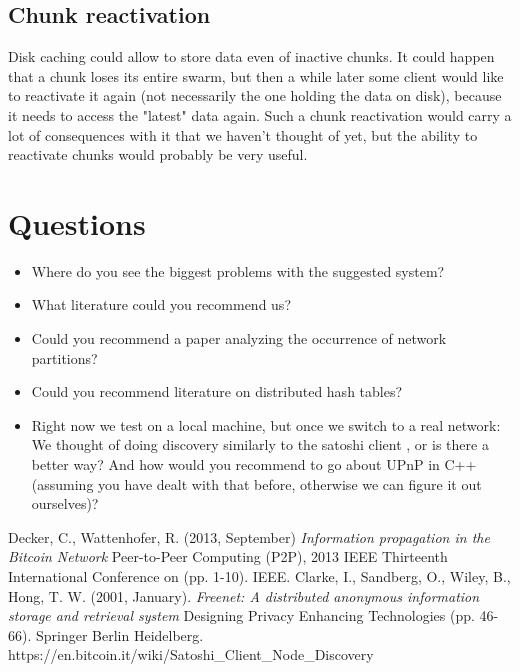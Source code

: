 \documentclass{article}
\begin{document}
\subsection{Chunk reactivation}

Disk caching could allow to store data even of inactive chunks. It could happen
that a chunk loses its entire swarm, but then a while later some client would
like to reactivate it again (not necessarily the one holding the data on disk),
because it needs to access the "latest" data again. Such a chunk reactivation
would carry a lot of consequences with it that we haven't thought of yet, but 
the ability to reactivate chunks would probably be very useful.

\section{Questions}

\begin{itemize}
  \itemsep0em
  \item Where do you see the biggest problems with the suggested system?
  \item What literature could you recommend us?
  \item Could you recommend a paper analyzing the occurrence of network
    partitions?
  \item Could you recommend literature on distributed hash tables?
  \item Right now we test on a local machine, but once we switch to a real
    network: We thought of doing discovery similarly to the satoshi client
    \cite{discovery}, or is there a better way? 
    And how would you recommend to go about UPnP in C++ (assuming you have dealt
    with that before, otherwise we can figure it out ourselves)?
\end{itemize}

\begin{thebibliography}{9}
   Decker, C., Wattenhofer, R. (2013, September) 
    \emph{Information propagation in the Bitcoin Network} 
    Peer-to-Peer Computing (P2P), 2013 IEEE Thirteenth International Conference
    on (pp. 1-10). IEEE.
   Clarke, I., Sandberg, O., Wiley, B., Hong, T. W. 
    (2001, January). \emph{Freenet: A distributed anonymous information storage
    and retrieval system} Designing Privacy Enhancing Technologies (pp. 46-66).
    Springer Berlin Heidelberg.
    https://en.bitcoin.it/wiki/Satoshi\_Client\_Node\_Discovery
\end{thebibliography}
\end{document}
